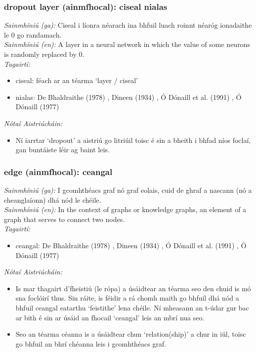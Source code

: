 \subsubsection*{dropout layer (ainmfhocal): ciseal nialas}
 \noindent \textit{Sainmhíniú (ga):} Ciseal i líonra néarach ina bhfuil luach roinnt néaróg ionadaithe le 0 go randamach.
\\
 \noindent \textit{Sainmhíniú (en):} A layer in a neural network in which the value of some neurons is randomly replaced by 0.
\\
 \noindent \textit{Tagairtí:}
\begin{itemize}
	\item ciseal: féach ar an téarma `layer / ciseal'
	\item nialas: De Bhaldraithe (1978) \cite{de-bhaldraithe}, Dineen (1934) \cite{dineen}, Ó Dónaill et al. (1991) \cite{focloir-beag}, Ó Dónaill (1977) \cite{odonaill}
\end{itemize}

 \noindent \textit{Nótaí Aistriúcháin:}
\begin{itemize}
	\item Ní iarrtar `dropout' a aistriú go litriúil toisc é sin a bheith i bhfad níos foclaí, gan buntáiste léir ag baint leis.
\end{itemize}


\subsubsection*{edge (ainmfhocal): ceangal}
 \noindent \textit{Sainmhíniú (ga):} I gcomhthéacs graf nó graf eolais, cuid de ghraf a nascann (nó a cheanglaíonn) dhá nód le chéile.
\\
 \noindent \textit{Sainmhíniú (en):} In the context of graphs or knowledge graphs, an element of a graph that serves to connect two nodes.
\\
 \noindent \textit{Tagairtí:}
\begin{itemize}
	\item ceangal: De Bhaldraithe (1978) \cite{de-bhaldraithe}, Dineen (1934) \cite{dineen}, Ó Dónaill et al. (1991) \cite{focloir-beag}, Ó Dónaill (1977) \cite{odonaill}
\end{itemize}

 \noindent \textit{Nótaí Aistriúcháin:}
\begin{itemize}
	\item Is mar thagairt d'fheistiú (le rópa) a úsáidtear an téarma seo den chuid is mó sna foclóirí thus. Sin ráite, is féidir a rá chomh maith go bhfuil dhá nód a bhfuil ceangal eatarthu `feistithe' lena chéile. Ní mheasann an t-údar gur bac ar bith é sin ar úsáid an fhocail `ceangal' leis an mbrí nua seo.
	\item Seo an téarma céanna is a úsáidtear chun `relation(ship)' a chur in iúl, toisc go bhfuil an bhrí chéanna leis i gcomhthéacs graf.
\end{itemize}


